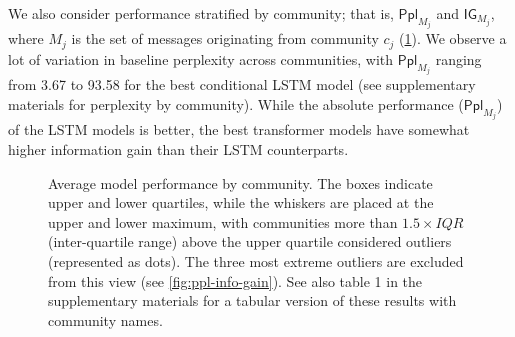 \documentclass[11pt]{article}
\newcommand\Ppl{\mathsf{Ppl}}
\newcommand\IG{\mathsf{IG}}
\begin{document}
We also consider performance stratified by community; that is,
$\Ppl_{M_j}$ and $\IG_{M_j}$, 
where $M_j$ is the set of messages originating from community $c_j$ 
(\cref{fig:comm-stratified-box}).
We observe a lot of variation in baseline perplexity
across communities, with $\Ppl_{M_j}$ ranging from \num{3.67} to
\num{93.58} for the best conditional LSTM model 
(see supplementary materials for perplexity by community). %
While the absolute performance ($\Ppl_{M_j}$) of the LSTM models is better,
the best transformer models have somewhat higher information gain
than their LSTM counterparts.


\newcommand{\modelboxplot}[3]{
  \addplot+[
    boxplot={draw position=#3, box extend=0.3}, 
    draw=#2, mark=*, mark options={fill=#2, scale=0.5}, solid, fill=#2!10,
    area legend] 
    table [y=#1] {floats/comm.csv};
}
\begin{figure}[t]
\caption{
  Average model performance by community.
  The boxes indicate upper and lower quartiles, while the whiskers are placed at the upper and lower maximum, with communities more than $1.5\times IQR$ (inter-quartile range) above the upper quartile considered outliers (represented as dots). The three most extreme outliers are excluded from this view (see \cref{fig:ppl-info-gain}).
   See also table 1 in the supplementary materials
   for a tabular version of these results with community names.
}
\label{fig:comm-stratified-box}
\end{figure}
\end{document}
